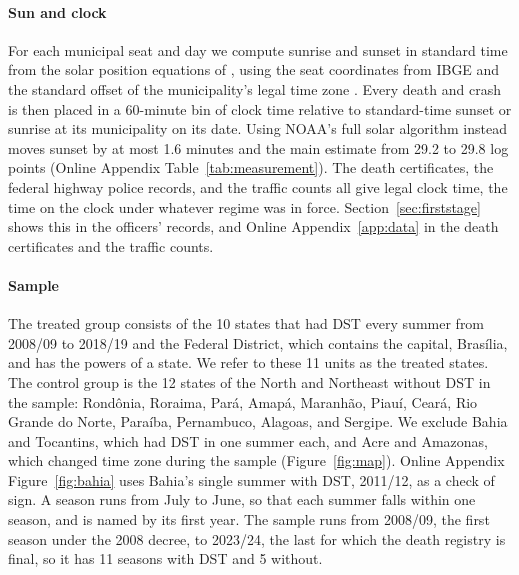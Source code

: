 \paragraph{Sun and clock}

For each municipal seat and day we compute sunrise and sunset in standard time from the solar position equations of \citet{noaa2025solar}, using the seat coordinates from IBGE \citep{ibge2010sedes, ibge2020municipios} and the standard offset of the municipality's legal time zone \citep{brasil1913decreto, brasil2008lei, brasil2013lei}. Every death and crash is then placed in a 60-minute bin of clock time relative to standard-time sunset or sunrise at its municipality on its date. Using NOAA's full solar algorithm \citep{meeus1998astronomical} instead moves sunset by at most 1.6 minutes and the main estimate from 29.2 to 29.8 log points (Online Appendix Table~\ref{tab:measurement}). The death certificates, the federal highway police records, and the traffic counts all give legal clock time, the time on the clock under whatever regime was in force. Section~\ref{sec:firststage} shows this in the officers' records, and Online Appendix~\ref{app:data} in the death certificates and the traffic counts.

\paragraph{Sample}

The treated group consists of the 10 states that had DST every summer from 2008/09 to 2018/19 and the Federal District, which contains the capital, Bras\'ilia, and has the powers of a state. We refer to these 11 units as the treated states. The control group is the 12 states of the North and Northeast without DST in the sample: Rond\^onia, Roraima, Par\'a, Amap\'a, Maranh\~ao, Piau\'i, Cear\'a, Rio Grande do Norte, Para\'iba, Pernambuco, Alagoas, and Sergipe. We exclude Bahia and Tocantins, which had DST in one summer each, and Acre and Amazonas, which changed time zone during the sample (Figure~\ref{fig:map}). Online Appendix Figure~\ref{fig:bahia} uses Bahia's single summer with DST, 2011/12, as a check of sign. A season runs from July to June, so that each summer falls within one season, and is named by its first year. The sample runs from 2008/09, the first season under the 2008 decree, to 2023/24, the last for which the death registry is final, so it has 11 seasons with DST and 5 without.

